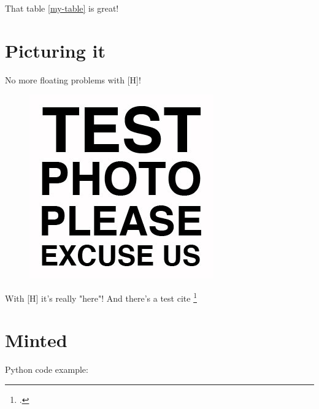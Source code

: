 \documentclass[bibliography=totoc,listof=totoc,BCOR=5mm,DIV=12,oneside]{scrbook}
\begin{document}
That table \ref{my-table} is great!

\chapter{Picturing it}

No more floating problems with [H]!

\begin{figure}[H]
\includegraphics[width=\textwidth]{test.jpg}
\end{figure}

With [H] it's really "here"! And there's a test cite \footcite{ieeecitation09}

\chapter{Minted}

Python code example:\\
\end{document}
